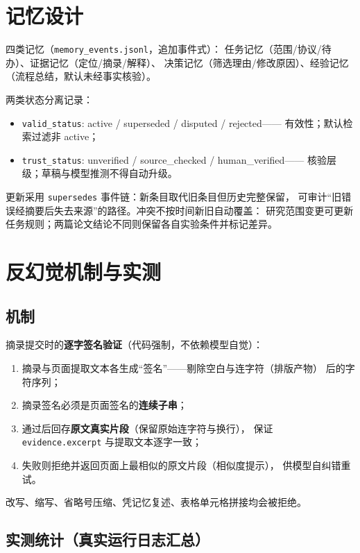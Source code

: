 \documentclass[UTF8, a4paper, zihao=-4]{ctexart}
\begin{document}
\section{记忆设计}

四类记忆（\texttt{memory\_events.jsonl}，追加事件式）：
任务记忆（范围/协议/待办）、证据记忆（定位/摘录/解释）、
决策记忆（筛选理由/修改原因）、经验记忆（流程总结，默认未经事实核验）。

两类状态分离记录：
\begin{itemize}
  \item \texttt{valid\_status}: active / superseded / disputed / rejected——
        有效性；默认检索过滤非 active；
  \item \texttt{trust\_status}: unverified / source\_checked / human\_verified——
        核验层级；草稿与模型推测不得自动升级。
\end{itemize}

更新采用 \texttt{supersedes} 事件链：新条目取代旧条目但历史完整保留，
可审计``旧错误经摘要后失去来源''的路径。冲突不按时间新旧自动覆盖：
研究范围变更可更新任务规则；两篇论文结论不同则保留各自实验条件并标记差异。

\section{反幻觉机制与实测}

\subsection{机制}

摘录提交时的\textbf{逐字签名验证}（代码强制，不依赖模型自觉）：
\begin{enumerate}
  \item 摘录与页面提取文本各生成``签名''——剔除空白与连字符（排版产物）
        后的字符序列；
  \item 摘录签名必须是页面签名的\textbf{连续子串}；
  \item 通过后回存\textbf{原文真实片段}（保留原始连字符与换行），
        保证 \texttt{evidence.excerpt} 与提取文本逐字一致；
  \item 失败则拒绝并返回页面上最相似的原文片段（相似度提示），
        供模型自纠错重试。
\end{enumerate}

改写、缩写、省略号压缩、凭记忆复述、表格单元格拼接均会被拒绝。

\subsection{实测统计（真实运行日志汇总）}
\end{document}
